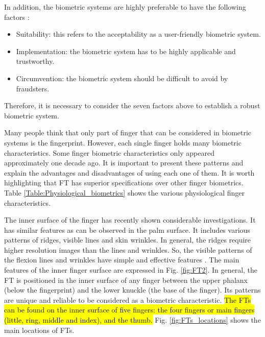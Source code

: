 \documentclass[review]{elsarticle}
\begin{document}
	In addition, the biometric systems are highly preferable to have the following factors \cite{Jain2004AnIntroduction}:
	\begin{itemize}
		\item Suitability: this refers to the acceptability as a user-friendly biometric system. 
		\item Implementation: the biometric system has to be highly applicable and trustworthy.
		\item Circumvention: the biometric system should be difficult to avoid by fraudsters.
	\end{itemize}

	Therefore, it is necessary to consider the seven factors above to establish a robust biometric system. 
	
	Many people think that only part of finger that can be considered in biometric systems is the fingerprint. However, each single finger holds many biometric characteristics. Some finger biometric characteristics only appeared approximately one decade ago. It is important to present these patterns and explain the advantages and disadvantages of using each one of them. It is worth highlighting that FT has superior specifications over other finger biometrics. Table \ref{Table:Physiological_biometrics} shows the various physiological finger characteristics.
	
	The inner surface of the finger has recently shown considerable investigations. It has similar features as can be observed in the palm surface. It includes various patterns of ridges, visible lines and skin wrinkles. In general, the ridges require higher resolution images than the lines and wrinkles. So, the visible patterns of the flexion lines and wrinkles have simple and effective features \cite{li2004personal}. The main features of the inner finger surface are expressed in Fig. \ref{fig:FT2}. In general, the FT is positioned in the inner surface of any finger between the upper phalanx (below the fingerprint) and the lower knuckle (the base of the finger). Its patterns are unique and reliable to be considered as a biometric characteristic. \hl{The FTs can be found on the inner surface of five fingers: the four fingers or main fingers (little, ring, middle and index), and the thumb.} Fig. \ref{fig:FTs_locations} shows the main locations of FTs.
\end{document}
